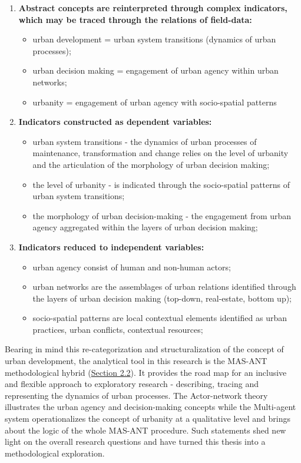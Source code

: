 \documentclass[11pt]{report}
\begin{document}
\begin{enumerate}
\item \textbf{Abstract concepts are reinterpreted through complex indicators, which may be traced through the relations of field-data:}

\begin{itemize}
\item urban development = urban system transitions (dynamics of urban processes);
\item urban decision making = engagement of urban agency within urban networks;
\item urbanity = engagement of urban agency with socio-spatial patterns
\end{itemize}

\item \textbf{Indicators constructed as dependent variables:}
\begin{itemize}
\item urban system transitions - the dynamics of urban processes of maintenance, transformation and change relies on the level of urbanity and the articulation of the morphology of urban decision making;
\item the level of urbanity - is indicated through the socio-spatial patterns of urban system transitions;
\item the morphology of urban decision-making - the engagement from urban agency aggregated within the layers of urban decision making;
\end{itemize}

\item \textbf{Indicators reduced to independent variables:}
\begin{itemize}
\item urban agency consist of human and non-human actors;
\item urban networks are the assemblages of urban relations identified through the layers of urban decision making (top-down, real-estate, bottom up);
\item socio-spatial patterns are local contextual elements identified as urban practices, urban conflicts, contextual resources;
\end{itemize}
\end{enumerate}

Bearing in mind this re-categorization and structuralization of the concept of urban development, the analytical tool in this research is the MAS-ANT methodological hybrid (\href{Section 2.2}{Section 2.2}). 
It provides the road map for an inclusive and flexible approach to exploratory research - describing, tracing and representing the dynamics of urban processes. The Actor-network theory illustrates the urban agency and decision-making concepts while the Multi-agent system operationalizes the concept of urbanity at a qualitative level and brings about the logic of the whole MAS-ANT procedure. Such statements shed new light on the overall research questions and have turned this thesis into a methodological exploration.
\\
\end{document}
